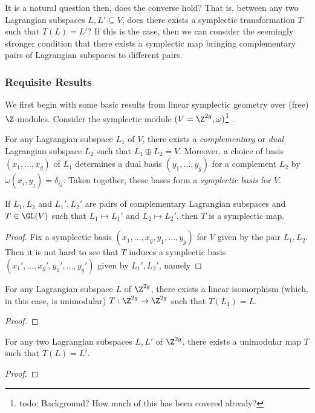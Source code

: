 It is a natural question then, does the converse hold? That is, between any two Lagrangian subspaces $L,L' \subseteq V$, does there exists a symplectic transformation $T$ such that $T(L) = L'$? If this is the case, then we can consider the seemingly stronger condition that there exists a symplectic map bringing complementary pairs of Lagrangian subspaces to different pairs.

\subsubsection*{Requisite Results}
We first begin with some basic results from linear symplectic geometry over (free) $\Z$-modules. Consider the symplectic module $(V = \Z^{2g}, \omega)$\footnote{todo: Background? How much of this has been covered already?} .
\begin{theorem}
	For any Lagrangian subspace $L_1$ of $V$, there exists a \textit{complementary} or \textit{dual} Lagrangian subspace $L_2$ such that $L_1 \oplus L_2 = V$. Moreover, a choice of basis $(x_1,\dots,x_g)$ of $L_1$ determines a dual basis $(y_1,\dots,y_g)$ for a complement $L_2$ by $\omega(x_i, y_j) = \delta_{ij}$. Taken together, these bases form a \textit{symplectic basis} for $V$. 
\end{theorem}

\begin{proposition}
	If $L_1,L_2$ and $L_1',L_2'$ are pairs of complementary Lagrangian subspaces and $T \in \GL(V)$ such that $L_1 \mapsto L_1'$ and $L_2 \mapsto L_2'$, then $T$ is a symplectic map.
\end{proposition}
\begin{proof}
	Fix a symplectic basis $(x_1,\dots,x_g,y_1,\dots,y_g)$ for $V$ given by the pair $L_1,L_2$. Then it is not hard to see that $T$ induces a symplectic basis $(x_1',\dots,x_g',y_1',\dots,y_g')$ given by $L_1',L_2'$, namely 
\end{proof}


\begin{proposition}
	For any Lagrangian subspace $L$ of $\Z^{2g}$, there exists a linear isomorphism (which, in this case, is unimodular) $T: \Z^{2g} \to \Z^{2g}$ such that $T(L_1) = L$.
\end{proposition}
\begin{proof}
	
\end{proof}

\begin{corollary}
	For any two Lagrangian subspaces $L,L'$ of $\Z^{2g}$, there exists a unimodular map $T$ such that $T(L) = L'$.
\end{corollary}

\begin{proof}
	
\end{proof}

